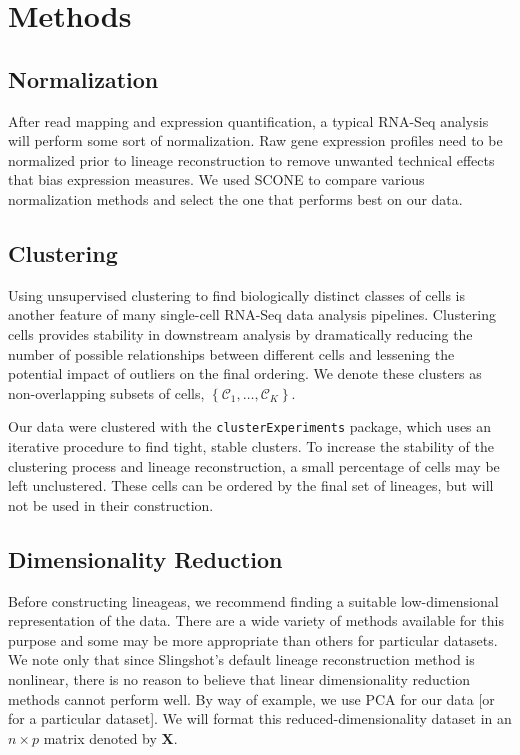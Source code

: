 \documentclass[11pt]{article}\usepackage[]{graphicx}\usepackage[]{color}
\begin{document}
\section{Methods}

\subsection{Normalization}
After read mapping and expression quantification, a typical RNA-Seq analysis will perform some sort of normalization. Raw gene expression profiles need to be normalized prior to lineage reconstruction to remove unwanted technical effects that bias expression measures. We used SCONE to compare various normalization methods and select the one that performs best on our data.

\subsection{Clustering}
Using unsupervised clustering to find biologically distinct classes of cells is another feature of many single-cell RNA-Seq data analysis pipelines. Clustering cells provides stability in downstream analysis by dramatically reducing the number of possible relationships between different cells and lessening the potential impact of outliers on the final ordering. We denote these clusters as non-overlapping subsets of cells, $\left\{\mathcal{C}_1,\dots,\mathcal{C}_K\right\}$.

Our data were clustered with the \texttt{clusterExperiments} package, which uses an iterative procedure to find tight, stable clusters. To increase the stability of the clustering process and lineage reconstruction, a small percentage of cells may be left unclustered. These cells can be ordered by the final set of lineages, but will not be used in their construction.

\subsection{Dimensionality Reduction}
Before constructing lineageas, we recommend finding a suitable low-dimensional representation of the data. There are a wide variety of methods available for this purpose and some may be more appropriate than others for particular datasets. We note only that since Slingshot's default lineage reconstruction method is nonlinear, there is no reason to believe that linear dimensionality reduction methods cannot perform well. By way of example, we use PCA for our data [or for a particular dataset]. We will format this reduced-dimensionality dataset in an $n \times p$ matrix denoted by $\mathbf{X}$.
\end{document}
